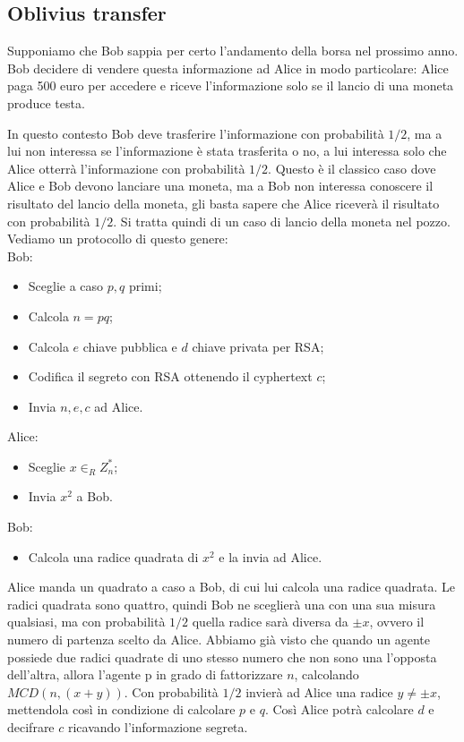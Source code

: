 \subsection{Oblivius transfer}
Supponiamo che Bob sappia per certo l'andamento della borsa nel prossimo anno. Bob decidere di vendere questa informazione ad Alice in modo particolare: Alice paga 500 euro per accedere e riceve l'informazione solo se il lancio di una moneta produce testa. 

In questo contesto Bob deve trasferire l'informazione con probabilità $1/2$, ma a lui non interessa se l'informazione è stata trasferita o no, a lui interessa solo che Alice otterrà l'informazione con probabilità $1/2$. Questo è il classico caso dove Alice e Bob devono lanciare una moneta, ma a Bob non interessa conoscere il risultato del lancio della moneta, gli basta sapere che Alice riceverà il risultato con probabilità $1/2$. Si tratta quindi di un caso di lancio della moneta nel pozzo. \\

\noindent Vediamo un protocollo di questo genere:\\

\noindent Bob:
\begin{itemize}
    \item Sceglie a caso $p, q$ primi;
    \item Calcola $n = pq$;
    \item Calcola $e$ chiave pubblica e $d$ chiave privata per RSA;
    \item Codifica il segreto con RSA ottenendo il cyphertext $c$;
    \item Invia $n, e, c$ ad Alice.
\end{itemize}

\noindent Alice:
\begin{itemize}
    \item Sceglie $x \in_R Z_n^*$;
    \item Invia $x^2$ a Bob.
\end{itemize}

\noindent Bob:
\begin{itemize}
    \item Calcola una radice quadrata di $x^2$ e la invia ad Alice.
\end{itemize}

\noindent Alice manda un quadrato a caso a Bob, di cui lui calcola una radice quadrata. Le radici quadrata sono quattro, quindi Bob ne sceglierà una con una sua misura qualsiasi, ma con probabilità $1/2$ quella radice sarà diversa da $\pm x$, ovvero il numero di partenza scelto da Alice. Abbiamo già visto che quando un agente possiede due radici quadrate di uno stesso numero che non sono una l'opposta dell'altra, allora l'agente p in grado di fattorizzare $n$, calcolando $MCD(n, (x+y))$. Con probabilità $1/2$ invierà ad Alice una radice $y \ne \pm x$, mettendola così in condizione di calcolare $p$ e $q$. Così Alice potrà calcolare $d$ e decifrare $c$ ricavando l'informazione segreta.\\

